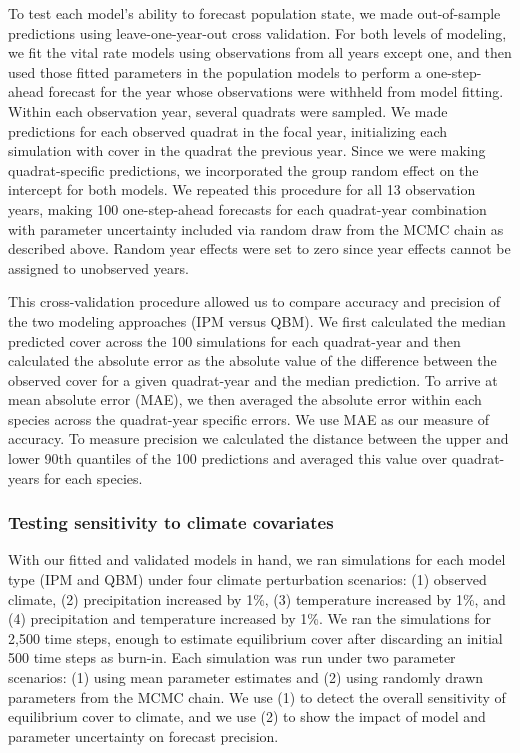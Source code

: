 \documentclass[12pt,]{article}
\begin{document}
To test each model's ability to forecast population state, we made
out-of-sample predictions using leave-one-year-out cross validation. For
both levels of modeling, we fit the vital rate models using observations
from all years except one, and then used those fitted parameters in the
population models to perform a one-step-ahead forecast for the year
whose observations were withheld from model fitting. Within each
observation year, several quadrats were sampled. We made predictions for
each observed quadrat in the focal year, initializing each simulation
with cover in the quadrat the previous year. Since we were making
quadrat-specific predictions, we incorporated the group random effect on
the intercept for both models. We repeated this procedure for all 13
observation years, making 100 one-step-ahead forecasts for each
quadrat-year combination with parameter uncertainty included via random
draw from the MCMC chain as described above. Random year effects were
set to zero since year effects cannot be assigned to unobserved years.

This cross-validation procedure allowed us to compare accuracy and
precision of the two modeling approaches (IPM versus QBM). We first
calculated the median predicted cover across the 100 simulations for
each quadrat-year and then calculated the absolute error as the absolute
value of the difference between the observed cover for a given
quadrat-year and the median prediction. To arrive at mean absolute error
(MAE), we then averaged the absolute error within each species across
the quadrat-year specific errors. We use MAE as our measure of accuracy.
To measure precision we calculated the distance between the upper and
lower 90th quantiles of the 100 predictions and averaged this value over
quadrat-years for each species.

\subsubsection{Testing sensitivity to climate
covariates}\label{testing-sensitivity-to-climate-covariates}

With our fitted and validated models in hand, we ran simulations for
each model type (IPM and QBM) under four climate perturbation scenarios:
(1) observed climate, (2) precipitation increased by 1\%, (3)
temperature increased by 1\%, and (4) precipitation and temperature
increased by 1\%. We ran the simulations for 2,500 time steps, enough to
estimate equilibrium cover after discarding an initial 500 time steps as
burn-in. Each simulation was run under two parameter scenarios: (1)
using mean parameter estimates and (2) using randomly drawn parameters
from the MCMC chain. We use (1) to detect the overall sensitivity of
equilibrium cover to climate, and we use (2) to show the impact of model
and parameter uncertainty on forecast precision.
\end{document}
